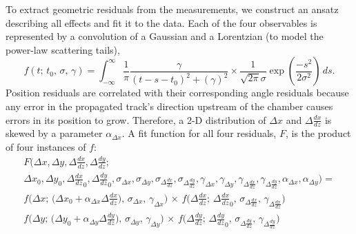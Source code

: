 To extract geometric residuals from the measurements, we construct an
ansatz describing all effects and fit it to the data.  Each of the
four observables is represented by a convolution of a Gaussian and a
Lorentzian (to model the power-law scattering tails),
\begin{equation}
f(t; \, t_0, \, \sigma, \, \gamma) = \int_{-\infty}^\infty
\frac{1}{\pi}\frac{\gamma}{(t - s - t_0)^2 + (\gamma)^2} \times 
\frac{1}{\sqrt{2\pi} \sigma} \exp\left(\frac{-s^2}{2
  \sigma^2}\right) \, ds \mbox{.}
\label{eqn:fitfunction}
\end{equation}
Position residuals are correlated with their corresponding angle
residuals because any error in the propagated track's direction
upstream of the chamber causes errors in its position to grow.
Therefore, a 2-D distribution of $\Delta x$ and $\Delta \frac{dx}{dz}$
is skewed by a parameter $\alpha_{\Delta x}$.  A fit function for all
four residuals, $F$, is the product of four instances of $f$:
\begin{multline}
F\bigg(\Delta x, \Delta y, \Delta \tfrac{dx}{dz}, \Delta \tfrac{dy}{dz}; \\
{\Delta x}_0, {\Delta y}_0, {\Delta \frac{dx}{dz}}_0, {\Delta \frac{dy}{dz}}_0,
\sigma_{\Delta x}, \sigma_{\Delta y}, \sigma_{\Delta \tfrac{dx}{dz}}, \sigma_{\Delta \tfrac{dy}{dz}}, 
\gamma_{\Delta x}, \gamma_{\Delta y}, \gamma_{\Delta \tfrac{dx}{dz}}, \gamma_{\Delta \tfrac{dy}{dz}}, 
\alpha_{\Delta x}, \alpha_{\Delta y}) = \\
f\bigg(\Delta x; \, \big({\Delta x}_0 + \alpha_{\Delta x} \Delta \tfrac{dx}{dz}\big), \, \sigma_{\Delta x}, \, \gamma_{\Delta x}\bigg) \, \times \,
f\bigg(\Delta \tfrac{dx}{dz}; \, {\Delta \tfrac{dx}{dz}}_0, \, \sigma_{\Delta \tfrac{dx}{dz}}, \, \gamma_{\Delta \tfrac{dx}{dz}}\bigg) \\
f\bigg(\Delta y; \, \big({\Delta y}_0 + \alpha_{\Delta y} \Delta \tfrac{dy}{dz}\big), \, \sigma_{\Delta y}, \, \gamma_{\Delta y}\bigg) \, \times \,
f\bigg(\Delta \tfrac{dy}{dz}; \, {\Delta \tfrac{dy}{dz}}_0, \, \sigma_{\Delta \tfrac{dy}{dz}}, \, \gamma_{\Delta \tfrac{dy}{dz}}\bigg)
\end{multline}


